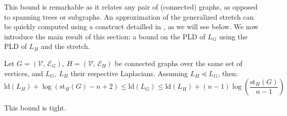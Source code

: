 This bound is remarkable as it relates any pair of (connected) graphs,
as opposed to spanning trees or subgraphs. An approximation of the
generalized stretch can be quickly computed using a construct detailled
in \cite{Spielman2009}, as we will see below. We now introduce the
main result of this section: a bound on the PLD of $L_{G}$ using
the PLD of $L_{H}$ and the stretch.

\begin{theorem}\label{thm:stretch-pld-bounds}Let $G=\left(\mathcal{V},\,\mathcal{E}_{G}\right),\, H=\left(\mathcal{V},\,\mathcal{E}_{H}\right)$
be connected graphs over the same set of vertices, and $L_{G}$, $L_{H}$
their respective Laplacians. Assuming $L_{H}\preceq L_{G}$, then:
\begin{equation}
\text{ld}\left(L_{H}\right)+\log\left(\text{st}_{H}\left(G\right)-n+2\right) \leq \text{ld}\left(L_{G}\right) \leq \text{ld}\left(L_{H}\right)+\left(n-1\right)\log\left(\frac{\text{st}_{H}\left(G\right)}{n-1}\right)
\label{eq:encadrement-1}
\end{equation}


This bound is tight.

\end{theorem}

